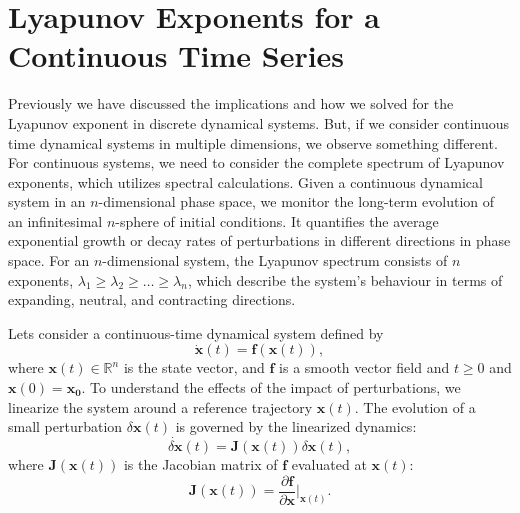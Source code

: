 \section{Lyapunov Exponents for a Continuous Time Series}

Previously we have discussed the implications and how we solved for the Lyapunov exponent in discrete dynamical systems. 
But, if we consider continuous time dynamical systems in multiple dimensions, we observe something different. 
For continuous systems, we need to consider the complete spectrum of Lyapunov exponents, which utilizes spectral calculations. 
Given a continuous dynamical system in an $n$-dimensional phase space, we monitor the long-term evolution of an infinitesimal $n$-sphere of initial conditions. 
It quantifies the average exponential growth or decay rates of perturbations in different directions in phase space. 
For an $n$-dimensional system, the Lyapunov spectrum consists of $n$ exponents, $\lambda_1 \geq \lambda_2 \geq \dots \geq \lambda_n$, which describe the system's behaviour in terms of expanding, neutral, and contracting directions.

Lets consider a continuous-time dynamical system defined by
$$
\dot{\mathbf{x}}(t) = \mathbf{f}(\mathbf{x}(t)),
$$
where $\mathbf{x}(t) \in \mathbb{R}^n$ is the state vector, and $\mathbf{f}$ is a smooth vector field and $t \geq0$ and $\mathbf{x}(0)=\mathbf{x_0}$. To understand the effects of the impact of perturbations, we linearize the system around a reference trajectory $\mathbf{x}(t)$. The evolution of a small perturbation $\delta\mathbf{x}(t)$ is governed by the linearized dynamics:
$$
\dot{\delta\mathbf{x}}(t) = \mathbf{J}(\mathbf{x}(t)) \delta\mathbf{x}(t),
$$
where $\mathbf{J}(\mathbf{x}(t))$ is the Jacobian matrix of $\mathbf{f}$ evaluated at $\mathbf{x}(t)$:
$$
\mathbf{J}(\mathbf{x}(t)) = \frac{\partial \mathbf{f}}{\partial \mathbf{x}} \bigg|_{\mathbf{x}(t)}.
$$


